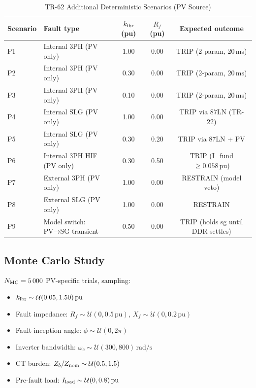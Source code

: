 \documentclass[11pt, a4paper]{article}
\newcommand{\pu}{\,\text{pu}}
\newcommand{\kIBR}{k_{\rm ibr}}
\begin{document}
\begin{table}[!t]
\centering
\caption{TR-62 Additional Deterministic Scenarios (PV Source)}
\label{tab:pv_scenarios}
\renewcommand{\arraystretch}{1.10}
\begin{tabular}{llccc}
\toprule
Scenario & Fault type & $\kIBR$ (pu) & $R_f$ (pu) & Expected outcome \\
\midrule
P1 & Internal 3PH (PV only)      & 1.00 & 0.00 & TRIP (2-param, 20\,ms) \\
P2 & Internal 3PH (PV only)      & 0.30 & 0.00 & TRIP (2-param, 20\,ms) \\
P3 & Internal 3PH (PV only)      & 0.10 & 0.00 & TRIP (2-param, 20\,ms) \\
P4 & Internal SLG (PV only)      & 1.00 & 0.00 & TRIP via 87LN (TR-22) \\
P5 & Internal SLG (PV only)      & 0.30 & 0.20 & TRIP via 87LN + PV \\
P6 & Internal 3PH HIF (PV only)  & 0.30 & 0.50 & TRIP (I\_fund $\geq 0.058\pu$) \\
P7 & External 3PH (PV only)      & 1.00 & 0.00 & RESTRAIN (model veto) \\
P8 & External SLG (PV only)      & 1.00 & 0.00 & RESTRAIN \\
P9 & Model switch: PV→SG transient & 0.50 & 0.00 & TRIP (holds sg until DDR settles) \\
\bottomrule
\end{tabular}
\end{table}

\subsection{Monte Carlo Study}

$N_{\rm MC} = 5\,000$ PV-specific trials, sampling:
\begin{itemize}
  \item $\kIBR \sim \mathcal{U}(0.05, 1.50)\pu$
  \item Fault impedance: $R_f \sim \mathcal{U}(0, 0.5\pu)$, $X_f \sim \mathcal{U}(0, 0.2\pu)$
  \item Fault inception angle: $\phi \sim \mathcal{U}(0, 2\pi)$
  \item Inverter bandwidth: $\omega_c \sim \mathcal{U}(300, 800)\,\text{rad/s}$
  \item CT burden: $Z_b/Z_{\rm nom} \sim \mathcal{U}(0.5, 1.5)$
  \item Pre-fault load: $I_{\rm load} \sim \mathcal{U}(0, 0.8)\pu$
\end{itemize}
\end{document}
